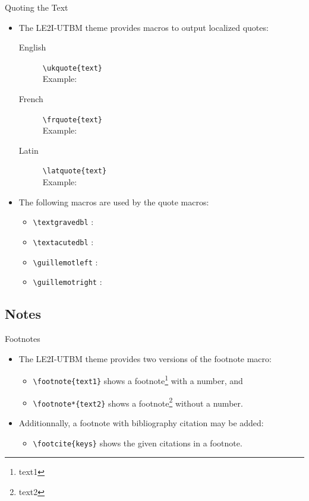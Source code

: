 \documentclass[english,sectioncirclenumberstyle]{le2iutbmbeamer}
\begin{document}
\begin{frame}{Quoting the Text}
	\begin{itemize}
	\item The LE2I-UTBM theme provides macros to output localized quotes:
		\begin{description}
		\item[English] \texttt{{\textbackslash}ukquote\{text\}} \\
			Example: 
		\item[French] \texttt{{\textbackslash}frquote\{text\}} \\
			Example: 
		\item[Latin] \texttt{{\textbackslash}latquote\{text\}} \\
			Example: 
		\end{description}
	\vspace{1em}
	\item The following macros are used by the quote macros:
		\begin{itemize}
		\item \texttt{{\textbackslash}textgravedbl} : \textgravedbl
		\item \texttt{{\textbackslash}textacutedbl} : \textacutedbl
		\item \texttt{{\textbackslash}guillemotleft} : \guillemotleft
		\item \texttt{{\textbackslash}guillemotright} : \guillemotright
		\end{itemize}
	\end{itemize}
\end{frame}

\subsection{Notes}
\tableofcontentslide[sectionstyle={show/shaded},subsectionstyle={show/shaded/hide},subsubsectionstyle={hide/hide/hide/hide},sections={3-}]

\begin{frame}{Footnotes}
	\begin{itemize}
	\item The LE2I-UTBM theme provides two versions of the footnote macro:
		\begin{itemize}
		\item \texttt{{\textbackslash}footnote\{text1\}} shows a footnote\footnote{text1} with a number, and
		\item \texttt{{\textbackslash}footnote*\{text2\}} shows a footnote\footnote*{text2} without a number.
		\end{itemize}
	\vspace{1em}
	\item Additionnally, a footnote with bibliography citation may be added:
		\begin{itemize}
		\item \texttt{{\textbackslash}footcite\{keys\}} shows the given citations in a footnote.
		\end{itemize}
	\end{itemize}
\end{frame}
\end{document}
